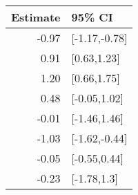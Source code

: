 \begin{tabular}{rl}
  \hline
Estimate & 95\% CI \\ 
  \hline
-0.97 & [-1.17,-0.78] \\ 
  0.91 & [0.63,1.23] \\ 
  1.20 & [0.66,1.75] \\ 
  0.48 & [-0.05,1.02] \\ 
  -0.01 & [-1.46,1.46] \\ 
  -1.03 & [-1.62,-0.44] \\ 
  -0.05 & [-0.55,0.44] \\ 
  -0.23 & [-1.78,1.3] \\ 
   \hline
\end{tabular}

